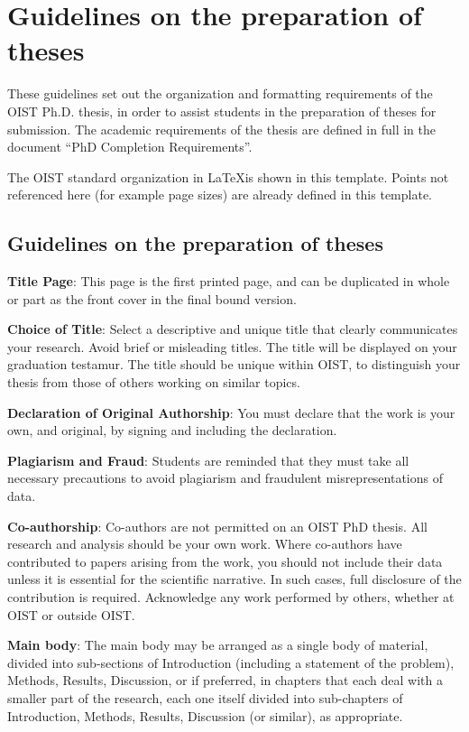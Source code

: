 
\chapter{Guidelines on the preparation of theses} \label{ch-1}

These guidelines set out the organization and formatting requirements of the OIST Ph.D. thesis, in order to assist students in the preparation of theses for submission. The academic requirements of the thesis are defined in full in the document ``PhD Completion Requirements''. 

The OIST standard organization in \LaTeX is shown in this template. Points not referenced here (for example page sizes) are already defined in this template.

\section{Guidelines on the preparation of theses}

\textbf{Title Page}:  This page is the first printed page, and can be duplicated in whole or part as the front cover in the final bound version.

\textbf{Choice of Title}: Select a descriptive and unique title that clearly communicates your research.  Avoid brief or misleading titles.  The title will be displayed on your graduation testamur.  The title should be unique within OIST, to distinguish your thesis from those of others working on similar topics.

\textbf{Declaration of Original Authorship}:  You must declare that the work is your own, and original,  by signing and including the declaration.  

\textbf{Plagiarism and Fraud}:  Students are reminded that they must take all necessary precautions to avoid plagiarism and fraudulent misrepresentations of data. 

\textbf{Co-authorship}:  Co-authors are not permitted on an OIST PhD thesis. All research and analysis should be your own work. Where co-authors have contributed to papers arising from the work, you should not include their data unless it is essential for the scientific narrative.  In such cases, full disclosure of the contribution is required. Acknowledge any work performed by others, whether at OIST or outside OIST.

\textbf{Main body}:  The main body may be arranged as a single body of material, divided into sub-sections of Introduction (including a statement of the problem), Methods, Results, Discussion, or if preferred, in chapters that each deal with a smaller part of the research, each one itself divided into sub-chapters of Introduction, Methods, Results, Discussion (or similar), as appropriate. 

